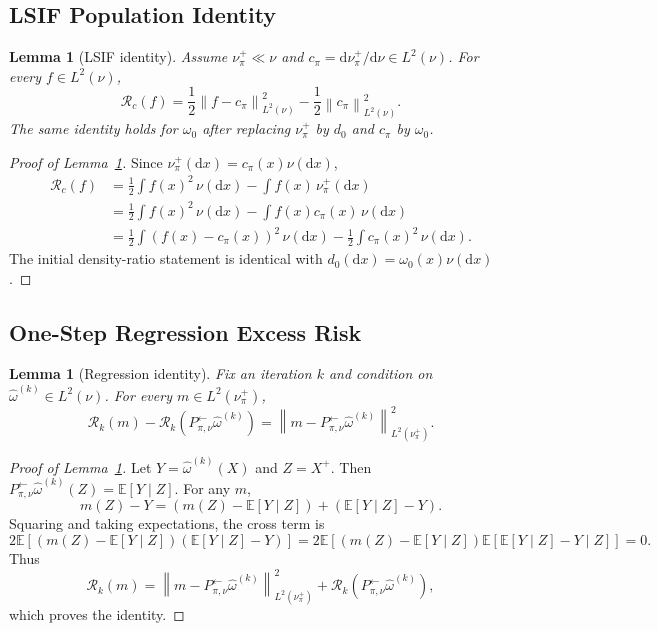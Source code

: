 \documentclass{article}
\newcommand{\E}{\mathbb{E}}
\newcommand{\1}{\mathbf{1}}
\newcommand{\dd}{\mathrm{d}}
\newcommand{\nup}{\nu_\pi^+}
\newcommand{\cpi}{c_\pi}
\newcommand{\omegazero}{\omega_0}
\newcommand{\Pback}{P_{\pi,\nu}^{\leftarrow}}
\newcommand{\Mpi}{\Pback}
\newcommand{\dinit}{d_0}
\newcommand{\omegahat}{\widehat{\omega}}
\newcommand{\norm}[2][]{\left\lVert #2 \right\rVert_{#1}}
\newcommand{\LtwoNu}[1]{\norm[L^2(\nu)]{#1}}
\newcommand{\LtwoNuPlus}[1]{\norm[L^2(\nu_\pi^+)]{#1}}
\newcommand{\Risk}{\mathcal{R}}
\theoremstyle{plain}
\newtheorem{lemma}[theorem]{Lemma}
\theoremstyle{definition}
\theoremstyle{remark}
\begin{document}
\subsection{LSIF Population Identity}

\begin{lemma}[LSIF identity]
\label{lem:lsif-identity}
Assume $\nup\ll\nu$ and $\cpi=\dd\nup/\dd\nu\in L^2(\nu)$.
For every $f\in L^2(\nu)$,
\[
    \Risk_c(f)
    =
    \frac12\LtwoNu{f-\cpi}^2-\frac12\LtwoNu{\cpi}^2.
\]
The same identity holds for $\omegazero$ after replacing $\nup$ by $\dinit$ and $\cpi$ by $\omegazero$.
\end{lemma}

\begin{proof}[Proof of Lemma~\ref{lem:lsif-identity}]
Since $\nup(\dd x)=\cpi(x)\nu(\dd x)$,
\[
\begin{aligned}
    \Risk_c(f)
    &=
    \frac12\int f(x)^2\,\nu(\dd x)
    -
    \int f(x)\,\nup(\dd x)\\
    &=
    \frac12\int f(x)^2\,\nu(\dd x)
    -
    \int f(x)\cpi(x)\,\nu(\dd x)\\
    &=
    \frac12\int (f(x)-\cpi(x))^2\,\nu(\dd x)
    -
    \frac12\int \cpi(x)^2\,\nu(\dd x).
\end{aligned}
\]
The initial density-ratio statement is identical with $\dinit(\dd x)=\omegazero(x)\nu(\dd x)$.
\end{proof}

\subsection{One-Step Regression Excess Risk}

\begin{lemma}[Regression identity]
\label{lem:regression-identity}
Fix an iteration $k$ and condition on $\omegahat^{(k)}\in L^2(\nu)$.
For every $m\in L^2(\nup)$,
\[
    \Risk_k(m)-\Risk_k(\Mpi\omegahat^{(k)})
    =
    \LtwoNuPlus{m-\Mpi\omegahat^{(k)}}^2.
\]
\end{lemma}

\begin{proof}[Proof of Lemma~\ref{lem:regression-identity}]
Let $Y=\omegahat^{(k)}(X)$ and $Z=X^+$.
Then $\Mpi\omegahat^{(k)}(Z)=\E[Y\mid Z]$.
For any $m$,
\[
    m(Z)-Y
    =
    \left(m(Z)-\E[Y\mid Z]\right)
    +
    \left(\E[Y\mid Z]-Y\right).
\]
Squaring and taking expectations, the cross term is
\[
    2\E\left[
        \left(m(Z)-\E[Y\mid Z]\right)
        \left(\E[Y\mid Z]-Y\right)
    \right]
    =
    2\E\left[
        \left(m(Z)-\E[Y\mid Z]\right)
        \E[\E[Y\mid Z]-Y\mid Z]
    \right]
    =
    0.
\]
Thus
\[
    \Risk_k(m)
    =
    \LtwoNuPlus{m-\Mpi\omegahat^{(k)}}^2
    +
    \Risk_k(\Mpi\omegahat^{(k)}),
\]
which proves the identity.
\end{proof}
\end{document}
